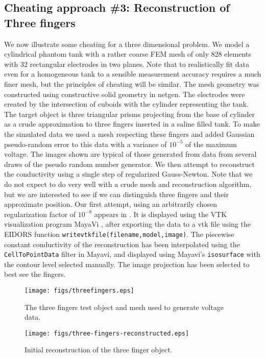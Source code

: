 \documentclass[12pt]{iopart}
\begin{document}
\subsection{
Cheating approach \#3:
     Reconstruction of Three fingers
}
We now illustrate some cheating for a three dimensional
problem. We model a cylindrical phantom tank with a rather
coarse FEM mesh of only 828 elements with 32 rectangular
electrodes in two planes. Note that to realistically
fit data even for a homogeneous tank to a sensible
measurement accuracy requires a much finer mesh, but the
principles of cheating will be similar. The mesh geometry
was constructed using constructive solid geometry in
netgen. The electrodes were created by the intersection
of cuboids with the cylinder representing the tank. The
target object is three triangular prisms projecting from
the base of cylinder as a crude approximation to three
fingers inserted in a saline filled tank. To make the
simulated data we used a mesh respecting these fingers
 and added Gaussian pseudo-random
error to this data with a variance of $10^{-5}$ of the maximum
voltage. The images shown are typical of those generated
from data from several draws of the pseudo random number
generator. We then attempt to reconstruct the conductivity
using a single step of regularized Gauss-Newton. Note that we do not expect to do
very well with a crude mesh and reconstruction algorithm,
but we are interested to see if we can distinguish three
fingers and their approximate position. Our first attempt,
using an arbitrarily chosen regularization factor
of $10^{-8}$ appears in . It is
displayed using the VTK visualization program MayaVi
\cite{Ramachandran_2003}, after exporting the data to a vtk file
using the EIDORS function {\tt writevtkfile(filename,model,image)}. The
piecewise constant conductivity of the reconstruction has
been interpolated using the {\tt CellToPointData} filter in
Mayavi, and displayed using Mayavi's {\tt isosurface} with
the contour level selected manually. The image projection
has been selected to best see the fingers.

%
%
\begin{figure}[th]
\texttt{[image: figs/threefingers.eps]}
\caption{\label{fig:threefingers}The three fingers test object and mesh used to generate voltage data.}
\end{figure}



%
%
\begin{figure}[th]
\texttt{[image: figs/three-fingers-reconstructed.eps]}
\caption{\label{fig:3fingers1}
Initial reconstruction of the three finger object.}
\end{figure}
\end{document}
